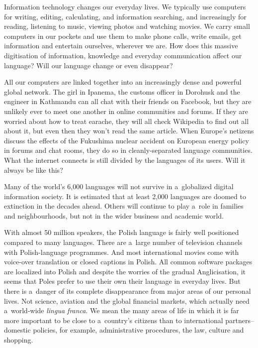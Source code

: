 \begin{multicols}{2} 

Information technology changes our everyday lives. We typically use
computers for writing, editing, calculating, and information
searching, and increasingly for reading, listening to music, viewing
photos and watching movies. We carry small computers in our pockets
and use them to make phone calls, write emails, get information and
entertain ourselves, wherever we are. How does this massive
digitisation of information, knowledge and everyday communication
affect our language? Will our language change or even disappear? 

All our computers are linked together into an increasingly dense and
powerful global network. The girl in Ipanema, the customs officer in
Dorohusk and the engineer in Kathmandu can all chat with their friends
on Facebook, but they are unlikely ever to meet one another in online
communities and forums. If they are worried about how to treat
earache, they will all check Wikipedia to find out all about it, but
even then they won’t read the same article. When Europe's netizens
discuss the effects of the Fukushima nuclear accident on European
energy policy in forums and chat rooms, they do so in
cleanly-separated language communities. What the internet connects is
still divided by the languages of its users. Will it always be like
this? 

Many of the world’s 6,000 languages will not survive in a~globalized
digital information society. It is estimated that at least 2,000
languages are doomed to extinction in the decades ahead. Others will
continue to play a~role in families and neighbourhoods, but not in the
wider business and academic world. 


With almost 50 million speakers, the Polish language is fairly well
positioned compared to many languages. There are a~large number of
television channels with Polish-language programmes. And most
international movies come with voice-over translation or closed
captions in Polish. All common software packages are localized into
Polish and despite the worries of the gradual Anglicisation, it seems
that Poles prefer to use their own their language in everyday lives.
But there is a~danger of its complete disappearance from major areas
of our personal lives. Not science, aviation and the global financial
markets, which actually need a~world-wide \textit{lingua franca}. We
mean the many areas of life in which it is far more important to be
close to a~country’s citizens than to international
partners--domestic policies, for example, administrative procedures,
the law, culture and shopping. 


\end{multicols}
